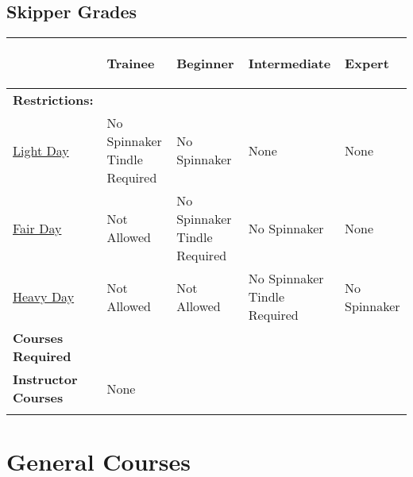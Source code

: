 \documentclass[12pt]{scrartcl}
\begin{document}
\newpage

\begin{landscape}

	\section{Skipper Grades} \label{sec:skipper grades}

	\label{tab:skipper grades}
	\begin{tabularx}{670pt}{|X|X|X|X|X|}
		\hline
		& \hypertarget{grade:trainee}{\bfseries{Trainee}} & \hypertarget{grade:beginner}{\bfseries{Beginner}} & \hypertarget{grade:intermediate}{\bfseries{Intermediate}} & \hypertarget{grade:expert}{\bfseries{Expert}} \\
		\hline
		\bfseries{Restrictions:} & & & & \\
		\hline
		\hyperlink{condition:light day}{Light Day} & No Spinnaker \newline Tindle Required & No Spinnaker & None & None \\
		\hline
		\hyperlink{condition:fair day}{Fair Day} & Not Allowed & No Spinnaker \newline Tindle Required & No Spinnaker & None \\
		\hline
		\hyperlink{condition:heavy day}{Heavy Day} & Not Allowed & Not Allowed & No Spinnaker \newline Tindle Required & No Spinnaker \\
		\hline
		\bfseries{Courses Required} & \nameref{subsec:rigging and land skills} \newline \nameref{subsec:basic sailing 1} & \nameref{subsec:safety procedures} \newline \nameref{subsec:basic sailing 2} & \nameref{subsec:intermediate sailing} \newline \nameref{subsec:spinnaker drill} & \nameref{subsec:advanced sailing} \\
		\hline
		\bfseries{Instructor Courses} & None & \multicolumn{3}{|c|}{\nameref{subsec:powerboat operation}} \\
		& & \multicolumn{3}{|c|}{\nameref{subsec:teaching tips and techniques}} \\
		\hline
	\end{tabularx}

\end{landscape}

\section{General Courses} \label{sec:general courses}
\end{document}
